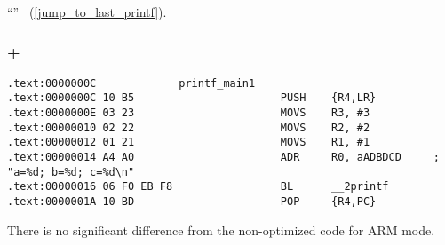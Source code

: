 ``\SwitchCaseDefaultSectionName'' 
~(\ref{jump_to_last_printf}).

\subsubsection{\OptimizingKeil + \ThumbMode}

\begin{lstlisting}[caption=\OptimizingKeil + \ThumbMode]
.text:0000000C             printf_main1
.text:0000000C 10 B5                       PUSH    {R4,LR}
.text:0000000E 03 23                       MOVS    R3, #3
.text:00000010 02 22                       MOVS    R2, #2
.text:00000012 01 21                       MOVS    R1, #1
.text:00000014 A4 A0                       ADR     R0, aADBDCD     ; "a=%d; b=%d; c=%d\n"
.text:00000016 06 F0 EB F8                 BL      __2printf
.text:0000001A 10 BD                       POP     {R4,PC}
\end{lstlisting}

{There is no significant difference from the non-optimized code for ARM mode}.



